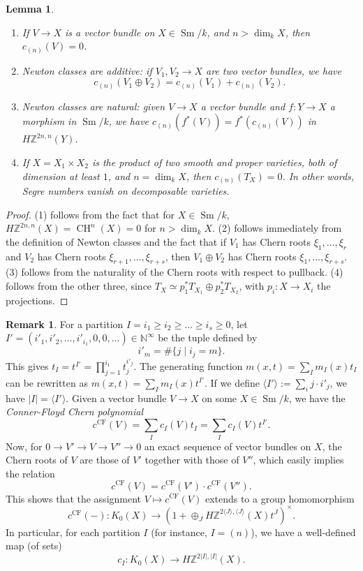 \documentclass[10pt]{amsart}
\theoremstyle{definition}
\newtheorem{rmk}[defn]{Remark}
\theoremstyle{plain}
\newtheorem{lemma}[defn]{Lemma}
\numberwithin{equation}{section}
\newcommand{\0}{\emptyset}
\newcommand{\N}{{\mathbb N}}
\newcommand{\Z}{{\mathbb Z}}
\newcommand{\Sm}{{\operatorname{Sm}}}
\newcommand{\CH}{{\operatorname{CH}}}
\renewcommand{\dim}{{\operatorname{dim}}}
\newcommand{\CF}{{\operatorname{CF}}}
\begin{document}
\begin{lemma}
\label{lemma:newtonclasses}
    \begin{enumerate}
        \item[(1)] If $V\to X$ is a vector bundle on $X\in \Sm/k$, and $n>\dim_kX$, then 
        $c_{(n)}(V)=0$.
        \item[(2)] Newton classes are additive: if $V_1, V_2 \to X$ are two vector bundles, we have
        $$c_{(n)}(V_1 \oplus V_2) = c_{(n)}(V_1)+c_{(n)}(V_2).$$
        \item[(3)] Newton classes are natural: given $V\to X$ a vector bundle and $f:Y\to X$ a morphism in $\Sm/k$, we have $c_{(n)}(f^*(V))=f^*(c_{(n)}(V))$ in $H\Z^{2n,n}(Y)$.
        \item[(4)] If $X = X_1 \times X_2$ is the product of two smooth and proper varieties, both of dimension at least $1$, and $n=\dim_kX$, then $c_{(n)}(T_X)=0$. In other words, Segre numbers vanish on decomposable varieties.
    \end{enumerate}
\end{lemma}

\begin{proof}
    (1) follows from the fact that for $X\in \Sm/k$,  $H\mathbb{Z}^{2n,n}(X)=\CH^n(X)=0$ for $n>\dim_kX$. (2) follows immediately from the definition of Newton classes and the fact that if $V_1$ has Chern roots $\xi_1, \ldots, \xi_r$ and $V_2$ has Chern roots $\xi_{r+1}, \ldots, \xi_{r+s}$, then $V_1\oplus V_2$ has Chern roots $\xi_1, \ldots, \xi_{r+s}$. (3) follows from the naturality of the Chern roots with respect to pullback. 
    (4) follows from the other three, since $T_X\simeq p_1^*T_{X_1}\oplus p_2^*T_{X_2}$, with $p_i:X \to X_i$ the projections. 
\end{proof}

\begin{rmk}
\label{rmk:NewtonClasses} For a partition $I=i_1\ge i_2\ge \ldots\ge i_s\ge 0$, let $I'=(i'_1,i'_2, \ldots, i'_{i_1}, 0,0,\ldots)\in \N^\infty$ be the tuple defined by
\[
i'_m=\#\{j\mid i_j=m\}.
\]
This gives $t_I=t^{I'}=\prod_{j=1}^{i_1}t_j^{i'_j}$. The generating function $m(x,t)=\sum_Im_I(x)t_I$ can be rewritten as $m(x,t)=\sum_Im_I(x)t^{I'}$. If we define $\langle I'\rangle:= \sum_ij\cdot i'_j$, we have  $|I|=\langle I'\rangle$. Given a vector bundle $V\to X$ on some $X\in \Sm/k$, we have the \emph{Conner-Floyd Chern polynomial} 
\[
c^\CF(V)=\sum_Ic_I(V)t_I=\sum_Ic_I(V)t^{I'}.
\]
Now, for $0\to V'\to V\to V''\to 0$ an exact sequence of vector bundles on $X$, the Chern roots of $V$ are those of $V'$ together with those of $V''$, which easily implies the relation
\[
c^\CF(V)= c^\CF(V')\cdot c^\CF(V'').
\]
This shows that the assignment $V\mapsto c^\CF(V)$ extends to a group homomorphism
\[
c^\CF(-):K_0(X)\to (1+\oplus_JH\Z^{2\langle J\rangle, \langle J\rangle}(X)t^J)^\times.
\]
In particular, for each partition $I$ (for instance, $I=(n)$), we have a well-defined map (of sets)
\[
c_I:K_0(X)\to H\Z^{2|I|,|I|}(X).
\]
 \end{rmk}
\end{document}
